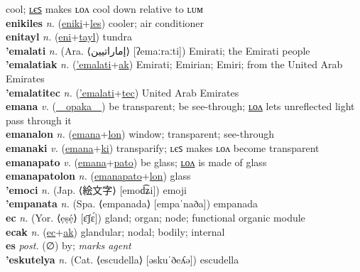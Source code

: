 cool; \hyperref[enikiles]{ʟєꜱ} makes ʟᴏᴧ cool down relative to ʟᴜᴍ \label{eniki} \\
\textbf{enikiles} \textit{n.} (\hyperref[eniki]{eniki}+\hyperref[les]{les})
cooler; air conditioner \label{enikiles} \\
\textbf{enitayl} \textit{n.} (\hyperref[eni]{eni}+\hyperref[tayl]{tayl})
tundra \label{enitayl} \\
\textbf{'emalati} \textit{n.} (Ara. ⟨إماراتيين‎⟩ [ʔemaːraːti])
Emirati; the Emirati people \label{'emalati} \\
\textbf{'emalatiak} \textit{n.} (\hyperref['emalati]{'emalati}+\hyperref[ak]{ak})
Emirati; Emirian; Emiri; from the United Arab Emirates \label{'emalatiak} \\
\textbf{'emalatitec} \textit{n.} (\hyperref['emalati]{'emalati}+\hyperref[tec]{tec})
United Arab Emirates \label{'emalatitec} \\
\textbf{emana} \textit{v.} (\hyperref[opaka]{~~opaka~~})
be transparent; be see-through; \hyperref[emanalon]{ʟᴏᴧ} lets unreflected light pass through it \label{emana} \\
\textbf{emanalon} \textit{n.} (\hyperref[emana]{emana}+\hyperref[lon]{lon})
window; transparent; see-through \label{emanalon} \\
\textbf{emanaki} \textit{v.} (\hyperref[emana]{emana}+\hyperref[ki]{ki})
transparify; ʟєꜱ makes ʟᴏᴧ become transparent \label{emanaki} \\
\textbf{emanapato} \textit{v.} (\hyperref[emana]{emana}+\hyperref[pato]{pato})
be glass; \hyperref[emanapatolon]{ʟᴏᴧ} is made of glass \label{emanapato} \\
\textbf{emanapatolon} \textit{n.} (\hyperref[emanapato]{emanapato}+\hyperref[lon]{lon})
glass \label{emanapatolon} \\
\textbf{'emoci} \textit{n.} (Jap. ⟨絵文字⟩ [emod͡ʑi])
emoji \label{'emoci} \\
\textbf{'empanata} \textit{n.} (Spa. ⟨empanada⟩ [empaˈnaða])
empanada \label{'empanata} \\
\textbf{ec} \textit{n.} (Yor. ⟨ẹṣẹ́⟩ [ɛ̄ʃɛ́])
gland; organ; node; functional organic module \label{ec} \\
\textbf{ecak} \textit{n.} (\hyperref[ec]{ec}+\hyperref[ak]{ak})
glandular; nodal; bodily; internal \label{ecak} \\
\textbf{es} \textit{post.} (∅)
by; \textit{marks agent} \label{es} \\
\textbf{'eskutelya} \textit{n.} (Cat. ⟨escudella⟩ [əskuˈðeʎə])
escudella \label{'eskutelya} \\

